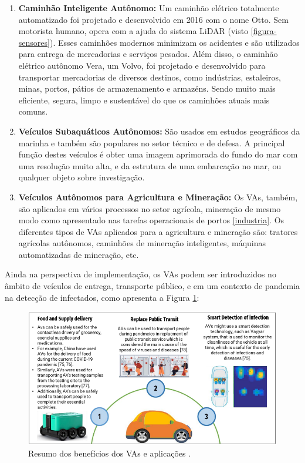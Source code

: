\begin{enumerate}
\item \textbf{Caminhão Inteligente Autônomo:} Um caminhão elétrico totalmente automatizado foi projetado e desenvolvido em 2016 com o nome Otto. Sem motorista humano, opera com a ajuda do sistema LiDAR (visto \ref{figura-sensores}). Esses caminhões modernos minimizam os acidentes e são utilizados para entrega de mercadorias e serviços pesados. Além disso, o caminhão elétrico autônomo Vera, um Volvo, foi projetado e desenvolvido para transportar mercadorias de diversos destinos, como indústrias, estaleiros, minas, portos, pátios de armazenamento e armazéns. Sendo muito mais eficiente, segura, limpo e sustentável do que os caminhões atuais mais comuns.

\item \textbf{Veículos Subaquáticos Autônomos:} São usados em estudos geográficos da marinha e também são populares no setor técnico e de defesa. A principal função destes veículos é obter uma imagem aprimorada do fundo do mar com uma resolução muito alta, e da estrutura de uma embarcação no mar, ou qualquer objeto sobre investigação.
\item \textbf{Veículos Autônomos para Agricultura e Mineração:}  Os VAs, também, são aplicados em vários processos no setor agrícola, mineração de mesmo modo como apresentado nas tarefas operacionais de portos \ref{industria}. Os diferentes tipos de VAs aplicados para a agricultura e mineração são: tratores agrícolas autônomos, caminhões de mineração inteligentes, máquinas automatizadas de mineração, etc.

\end{enumerate}

Ainda na perspectiva de implementação, os VAs podem ser introduzidos no âmbito de veículos de entrega, transporte público, e em um contexto de pandemia na detecção de infectados, como apresenta a Figura \ref{resumo_aplic}:

\begin{figure}[H]
\centering
\includegraphics[width=\textwidth]{Figures/aplic.png}
\caption{Resumo dos benefícios dos VAs e aplicações \cite{mundobrasil}.}
\label{resumo_aplic}
\end{figure}

